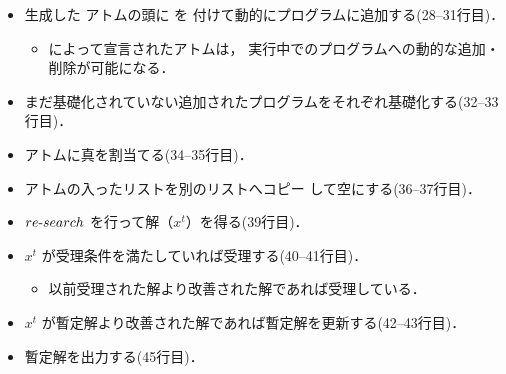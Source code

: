 \begin{itemize}
\item 生成した  アトムの頭に  を
付けて動的にプログラムに追加する(28--31行目)．
 \begin{itemize}
  \item {} によって宣言されたアトムは，
  実行中でのプログラムへの動的な追加・削除が可能になる．
 \end{itemize}
\item まだ基礎化されていない追加されたプログラムをそれぞれ基礎化する(32--33行目)．
\item {} アトムに真を割当てる(34--35行目)．
\item {} アトムの入ったリストを別のリストへコピー
して空にする(36--37行目)．
\item $re\mathchar`-search$ を行って解（$x^{t}$）を得る(39行目)．
\item $x^{t}$ が受理条件を満たしていれば受理する(40--41行目)．
 \begin{itemize}
  \item 以前受理された解より改善された解であれば受理している．
 \end{itemize}
\item $x^{t}$ が暫定解より改善された解であれば暫定解を更新する(42--43行目)．
\item 暫定解を出力する(45行目)．
\end{itemize}

